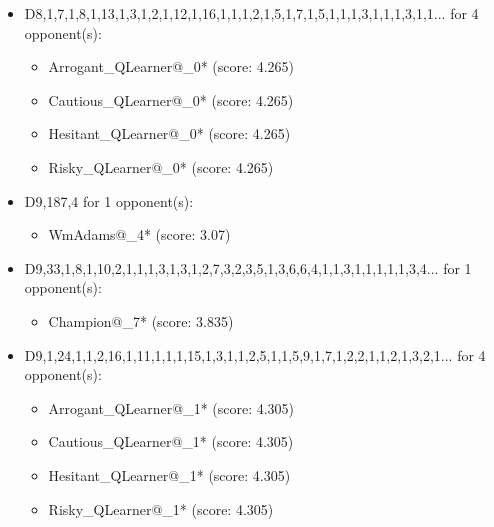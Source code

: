 \begin{appendices}
\begin{itemize}
    \item D8,1,7,1,8,1,13,1,3,1,2,1,12,1,16,1,1,1,2,1,5,1,7,1,5,1,1,1,3,1,1,1,3,1,1... for 4 opponent(s):
    \begin{multicols}{3}
         \begin{itemize}
            \item Arrogant\_QLearner@\_0* (score: 4.265)
            \item Cautious\_QLearner@\_0* (score: 4.265)
            \item Hesitant\_QLearner@\_0* (score: 4.265)
            \item Risky\_QLearner@\_0* (score: 4.265)
        \end{itemize}
     \end{multicols}
     
    \item D9,187,4 for 1 opponent(s):
    \begin{multicols}{3}
         \begin{itemize}
            \item WmAdams@\_4* (score: 3.07)
        \end{itemize}
     \end{multicols}
     
    \item D9,33,1,8,1,10,2,1,1,1,3,1,3,1,2,7,3,2,3,5,1,3,6,6,4,1,1,3,1,1,1,1,1,3,4... for 1 opponent(s):
    \begin{multicols}{3}
         \begin{itemize}
            \item Champion@\_7* (score: 3.835)
        \end{itemize}
     \end{multicols}
     
    \item D9,1,24,1,1,2,16,1,11,1,1,1,15,1,3,1,1,2,5,1,1,5,9,1,7,1,2,2,1,1,2,1,3,2,1... for 4 opponent(s):
    \begin{multicols}{3}
         \begin{itemize}
            \item Arrogant\_QLearner@\_1* (score: 4.305)
            \item Cautious\_QLearner@\_1* (score: 4.305)
            \item Hesitant\_QLearner@\_1* (score: 4.305)
            \item Risky\_QLearner@\_1* (score: 4.305)
        \end{itemize}
     \end{multicols}
     

\end{itemize}
\end{appendices}
